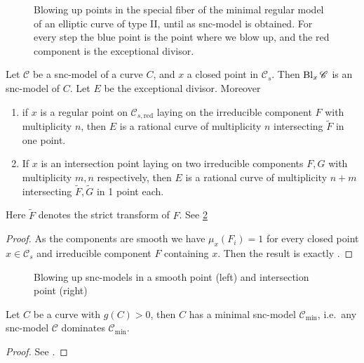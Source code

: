 \begin{figure}[ht]
    \centering
    \caption{Blowing up points in the special fiber of the minimal regular model of an elliptic curve of type II, until as snc-model is obtained. 
    For every step the blue point is the point where we blow up, and the red component is the exceptional divisor. }
    \label{fig:snc_model_curve_type_ii}
\end{figure}


\begin{lemma}\label{lem:blowup_snc}
	Let $\mathscr C$ be a snc-model of a curve $C$, and $x$ a closed point in $\mathscr C_s$. 
	Then $\operatorname{Bl}_x\mathscr C$ is an snc-model of $C$. Let $E$ be the exceptional divisor. 
	Moreover 
	\begin{enumerate}
		\item if $x$ is a regular point on $\mathscr C_{s, \text{red}}$ laying on the irreducible component $F$ with multiplicity $n$, then $E$ is a rational curve of multiplicity $n$ intersecting $\tilde F$ in one point. 
		\item If $x$ is an intersection point laying on two irreducible components $F, G$ with multiplicity  $m, n$ respectively, then $E$ is a rational curve of multiplicity $n + m$ intersecting $\tilde F, \tilde G$ in 1 point each. 
	\end{enumerate}
	Here $\tilde F$ denotes the strict transform of $F$. 
	See \cref{fig:blowup-snc}
\end{lemma}
\begin{proof}
	As the components are smooth we have $\mu_x(F_i) = 1 $ for every closed point $x \in \mathscr C_s$ and irreducible component  $F$ containing $x$. 
	Then the result is exactly \cite[exercise 9.2.9(a)]{liuAlgebraicGeometryArithmetic2002}.
\end{proof}
\begin{figure}[ht]
    \centering
    \caption{Blowing up snc-models in a smooth point (left) and intersection point (right)}
    \label{fig:blowup-snc}
\end{figure}




\begin{theorem}\label{thm:minimal_snc_model}
	Let $C$ be a curve with  $g(C) > 0$, then $C$ has a minimal snc-model $\mathscr C_\text{min} $, i.e.\ any snc-model $\mathscr C$ dominates $\mathscr C_\text{min} $. 
\end{theorem}
\begin{proof}
	See \cite[prop.\ 9.3.36]{liuAlgebraicGeometryArithmetic2002}.
\end{proof}

